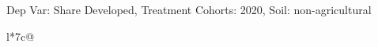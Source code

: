 \begin{table}[H]
\captionlistentry[table]{}
\label{table:beaver_land_class_DVis_land_class_3_SCg3_SSNAG}
\scriptsize %
Dep Var: Share Developed, Treatment Cohorts: 2020, Soil: non-agricultural \\
\begin{threeparttable}
\begin{tabulary}{\textwidth}{l*{7}{c}@{}}
\toprule \toprule
\noalign{\smallskip}
\noalign{\smallskip}
\midrule \bottomrule
\end{tabulary}
\medskip
\end{threeparttable}
\end{table}
